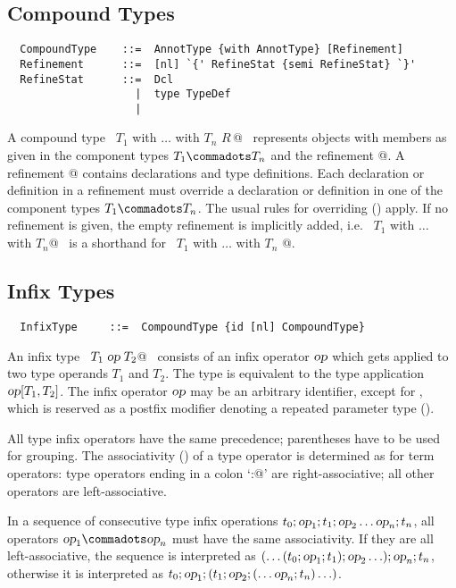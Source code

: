 \subsection{Compound Types}
\label{sec:compound-types}
\label{sec:refinements}

\syntax\begin{lstlisting}
  CompoundType    ::=  AnnotType {with AnnotType} [Refinement]
  Refinement      ::=  [nl] `{' RefineStat {semi RefineStat} `}'
  RefineStat      ::=  Dcl
                    |  type TypeDef
                    |
\end{lstlisting}

A compound type ~\lstinline@$T_1$ with $\ldots$ with $T_n$ {$R\,$}@~
represents objects with members as given in the component types $T_1
\commadots T_n$ and the refinement @. A refinement
@ contains declarations and type definitions. Each
declaration or definition in a refinement must override a declaration
or definition in one of the component types $T_1 \commadots T_n$. The
usual rules for overriding () apply. If no
refinement is given, the empty refinement is implicitly added,
i.e. ~\lstinline@$T_1$ with $\ldots$ with $T_n$@~ is a shorthand for
~\lstinline@$T_1$ with $\ldots$ with $T_n$ {}@.
 
\subsection{Infix Types}

\syntax\begin{lstlisting}
  InfixType     ::=  CompoundType {id [nl] CompoundType}
\end{lstlisting}
An infix type ~\lstinline@$T_1\;\mbox{\sl op}\;T_2$@~ consists of an infix
operator $\mbox{\sl op}$ which gets applied to two type operands $T_1$ and
$T_2$.  The type is equivalent to the type application $\mbox{\sl op}[T_1,
T_2]$.  The infix operator $\mbox{\sl op}$ may be an arbitrary identifier,
except for \code{*}, which is reserved as a postfix modifier 
denoting a repeated parameter type (). 

All type infix operators have the same precedence; parentheses have to
be used for grouping. The associativity ()
of a type operator is determined as for term operators: type operators
ending in a colon `\lstinline@:@' are right-associative; all other
operators are left-associative.

In a sequence of consecutive type infix operations $t_0; \mbox{\sl op}_1; t_1;
\mbox{\sl op}_2 \ldots \mbox{\sl op}_n; t_n$, all operators $\op_1 \commadots \op_n$ must have the same
associativity. If they are all left-associative, the sequence is
interpreted as $(\ldots(t_0;\mbox{\sl op}_1;t_1);\mbox{\sl op}_2\ldots);\mbox{\sl op}_n;t_n$,
otherwise it is interpreted as $t_0;\mbox{\sl op}_1;(t_1;\mbox{\sl op}_2;(\ldots\mbox{\sl op}_n;t_n)\ldots)$.

